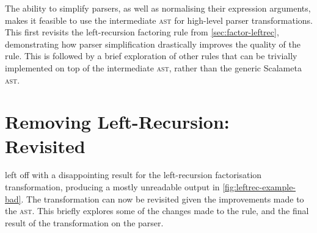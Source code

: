 \documentclass[../../main.tex]{subfiles}
\begin{document}
\label{sec:complex-rules}
The ability to simplify parsers, as well as normalising their expression arguments, makes it feasible to use the intermediate  \textsc{ast} for high-level parser transformations.
This  first revisits the left-recursion factoring rule from \cref{sec:factor-leftrec}, demonstrating how parser simplification drastically improves the quality of the rule.
This is followed by a brief exploration of other rules that can be trivially implemented on top of the intermediate \textsc{ast}, rather than the generic Scalameta \textsc{ast}.

\section{Removing Left-Recursion: Revisited}\label{sec:leftrec-revisited}
 left off with a disappointing result for the left-recursion factorisation transformation, producing a mostly unreadable output in \cref{fig:leftrec-example-bad}.
The transformation can now be revisited given the improvements made to the  \textsc{ast}.
This  briefly explores some of the changes made to the rule, and the final result of the transformation on the  parser.
\end{document}
